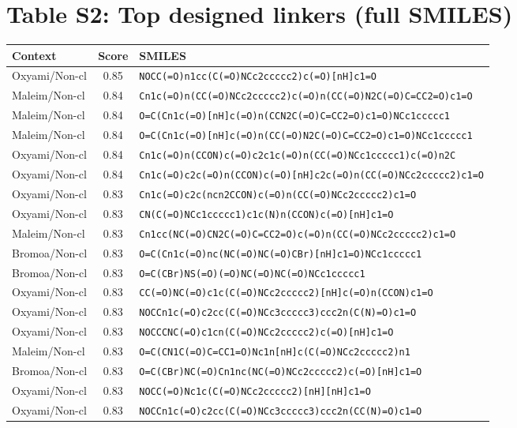 \documentclass[10pt]{article}
\begin{document}
\section{Table S2: Top designed linkers (full SMILES)}
\begin{longtable}{l c p{10cm}}\toprule
Context & Score & SMILES \\ \midrule\endhead
Oxyami/Non-cl & 0.85 & \texttt{NOCC(=O)n1cc(C(=O)NCc2ccccc2)c(=O)[nH]c1=O} \\
Maleim/Non-cl & 0.84 & \texttt{Cn1c(=O)n(CC(=O)NCc2ccccc2)c(=O)n(CC(=O)N2C(=O)C=CC2=O)c1=O} \\
Maleim/Non-cl & 0.84 & \texttt{O=C(Cn1c(=O)[nH]c(=O)n(CCN2C(=O)C=CC2=O)c1=O)NCc1ccccc1} \\
Maleim/Non-cl & 0.84 & \texttt{O=C(Cn1c(=O)[nH]c(=O)n(CC(=O)N2C(=O)C=CC2=O)c1=O)NCc1ccccc1} \\
Oxyami/Non-cl & 0.84 & \texttt{Cn1c(=O)n(CCON)c(=O)c2c1c(=O)n(CC(=O)NCc1ccccc1)c(=O)n2C} \\
Oxyami/Non-cl & 0.84 & \texttt{Cn1c(=O)c2c(=O)n(CCON)c(=O)[nH]c2c(=O)n(CC(=O)NCc2ccccc2)c1=O} \\
Oxyami/Non-cl & 0.83 & \texttt{Cn1c(=O)c2c(ncn2CCON)c(=O)n(CC(=O)NCc2ccccc2)c1=O} \\
Oxyami/Non-cl & 0.83 & \texttt{CN(C(=O)NCc1ccccc1)c1c(N)n(CCON)c(=O)[nH]c1=O} \\
Maleim/Non-cl & 0.83 & \texttt{Cn1cc(NC(=O)CN2C(=O)C=CC2=O)c(=O)n(CC(=O)NCc2ccccc2)c1=O} \\
Bromoa/Non-cl & 0.83 & \texttt{O=C(Cn1c(=O)nc(NC(=O)NC(=O)CBr)[nH]c1=O)NCc1ccccc1} \\
Bromoa/Non-cl & 0.83 & \texttt{O=C(CBr)NS(=O)(=O)NC(=O)NC(=O)NCc1ccccc1} \\
Oxyami/Non-cl & 0.83 & \texttt{CC(=O)NC(=O)c1c(C(=O)NCc2ccccc2)[nH]c(=O)n(CCON)c1=O} \\
Oxyami/Non-cl & 0.83 & \texttt{NOCCn1c(=O)c2cc(C(=O)NCc3ccccc3)ccc2n(C(N)=O)c1=O} \\
Oxyami/Non-cl & 0.83 & \texttt{NOCCCNC(=O)c1cn(C(=O)NCc2ccccc2)c(=O)[nH]c1=O} \\
Maleim/Non-cl & 0.83 & \texttt{O=C(CN1C(=O)C=CC1=O)Nc1n[nH]c(C(=O)NCc2ccccc2)n1} \\
Bromoa/Non-cl & 0.83 & \texttt{O=C(CBr)NC(=O)Cn1nc(NC(=O)NCc2ccccc2)c(=O)[nH]c1=O} \\
Oxyami/Non-cl & 0.83 & \texttt{NOCC(=O)Nc1c(C(=O)NCc2ccccc2)[nH][nH]c1=O} \\
Oxyami/Non-cl & 0.83 & \texttt{NOCCn1c(=O)c2cc(C(=O)NCc3ccccc3)ccc2n(CC(N)=O)c1=O} \\

\end{longtable}
\end{document}
